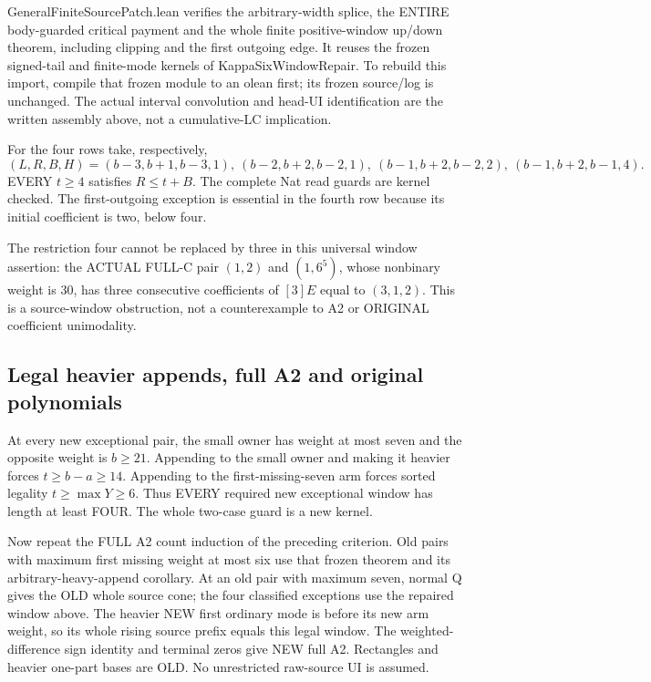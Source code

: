 GeneralFiniteSourcePatch.lean verifies the arbitrary-width splice,
the ENTIRE body-guarded critical payment and the whole finite
positive-window up/down theorem, including clipping and the first
outgoing edge. It reuses the frozen signed-tail and finite-mode
kernels of KappaSixWindowRepair. To rebuild this import, compile
that frozen module to an olean first; its frozen source/log is unchanged.
The actual interval convolution and head-UI identification are
the written assembly above, not a cumulative-LC implication.

For the four rows take, respectively,
\[
 (L,R,B,H)=(b-3,b+1,b-3,1),\ (b-2,b+2,b-2,1),
 \ (b-1,b+2,b-2,2),\ (b-1,b+2,b-1,4).
\]
EVERY $t\ge4$ satisfies $R\le t+B$. The complete Nat read guards
are kernel checked. The first-outgoing exception is essential in
the fourth row because its initial coefficient is two, below four.

The restriction four cannot be replaced by three in this universal
window assertion: the ACTUAL FULL-C pair $(1,2)$ and $(1,6^5)$,
whose nonbinary weight is 30, has three consecutive coefficients
of $[3]E$ equal to $(3,1,2)$. This is a source-window obstruction,
not a counterexample to A2 or ORIGINAL coefficient unimodality.

\subsection{Legal heavier appends, full A2 and original polynomials}
At every new exceptional pair, the small owner has weight at most
seven and the opposite weight is $b\ge21$. Appending to the small
owner and making it heavier forces $t\ge b-a\ge14$.
Appending to the first-missing-seven arm forces sorted legality
$t\ge\max Y\ge6$. Thus EVERY required new exceptional window
has length at least FOUR. The whole two-case guard is a new kernel.

Now repeat the FULL A2 count induction of the preceding criterion.
Old pairs with maximum first missing weight at most six use that
frozen theorem and its arbitrary-heavy-append corollary. At an old
pair with maximum seven, normal Q gives the OLD whole source cone;
the four classified exceptions use the repaired window above.
The heavier NEW first ordinary mode is before its new arm weight,
so its whole rising source prefix equals this legal window.
The weighted-difference sign identity and terminal zeros give
NEW full A2. Rectangles and heavier one-part bases are OLD.
No unrestricted raw-source UI is assumed.

